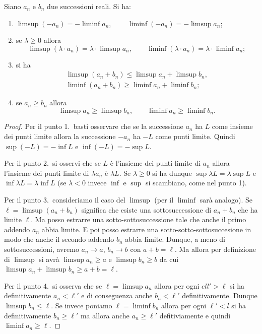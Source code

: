 \begin{theorem}
Siano $a_n$ e $b_n$ due successioni reali. Si ha:
\begin{enumerate}
  \item
  $\limsup (-a_n) = -\liminf a_n$, $\qquad\liminf (-a_n) = -\limsup a_n$;

  \item
    se $\lambda \ge 0$ allora
    \[
    \limsup (\lambda \cdot a_n) = \lambda \cdot \limsup a_n, \qquad
    \liminf (\lambda \cdot a_n) = \lambda \cdot \liminf a_n;
    \]

  \item
  si ha
  \begin{gather*}
  \limsup (a_n + b_n) \le \limsup a_n + \limsup b_n,
  \\
  \liminf (a_n + b_n) \ge \liminf a_n + \liminf b_n;
  \end{gather*}

  \item
  se $a_n \ge b_n$ allora
  \[
   \limsup a_n \ge \limsup b_n, \qquad \liminf a_n \ge \liminf b_n.
  \]

\end{enumerate}
\end{theorem}
%
\begin{proof}
  Per il punto 1.\ basti osservare che se la successione $a_n$ ha $L$ come
  insieme dei punti limite allora la successione $-a_n$ ha $-L$ come punti
  limite. Quindi $\sup (-L) = -\inf L$ e $\inf(-L) = -\sup L$.

  Per il punto 2.\ si osservi che se $L$ è l'insieme dei punti limite
  di $a_n$ allora l'insieme dei punti limite di $\lambda a_n$ è $\lambda L$.
  Se $\lambda \ge 0$ si ha dunque $\sup \lambda L = \lambda \sup L$
  e $\inf \lambda L = \lambda \inf L$ (se $\lambda<0$ invece $\inf$ e $\sup$
  si scambiano, come nel punto 1).

  Per il punto 3.\ consideriamo il caso del $\limsup$ (per il $\liminf$ sarà analogo).
  Se $\ell = \limsup(a_n+b_n)$ significa che esiste una sottosuccessione
  di $a_n+b_n$ che ha limite $\ell$. Ma posso estrarre una sotto-sottosuccessione
  tale che anche il primo addendo $a_n$ abbia limite. E poi posso estrarre
  una sotto-sotto-sottosuccesione in modo che anche il secondo addendo $b_n$
  abbia limite. Dunque, a meno di sottosuccessioni, avremo $a_n \to a$, $b_n \to b$
  con $a+b=\ell$.
  Ma allora per definizione di $\limsup$ si avrà $\limsup a_n \ge a$
  e $\limsup b_n \ge b$ da cui $\limsup a_n + \limsup b_n \ge a+b = \ell$.

  Per il punto 4.\ si osserva che se $\ell = \limsup a_n$ allora
  per ogni $ell'>\ell$ si ha definitivamente
    $a_n<\ell'$ e di conseguenza anche $b_n < \ell'$ definitivamente.
    Dunque $\limsup b_n \le \ell$.
    Se invece poniamo $\ell = \liminf b_n$ allora
    per ogni $\ell'<l$ si ha definitivamente $b_n \ge \ell'$ ma
    allora anche $a_n \ge \ell'$ defitiviamente e quindi
    $\liminf a_n \ge \ell$.
\end{proof}

